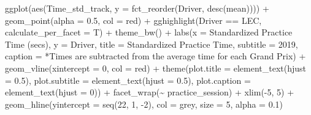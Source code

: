 \documentclass[
]{book}
\newenvironment{Shaded}{\begin{snugshade}}{\end{snugshade}}
\newcommand{\AttributeTok}[1]{\textcolor[rgb]{0.77,0.63,0.00}{#1}}
\newcommand{\DecValTok}[1]{\textcolor[rgb]{0.00,0.00,0.81}{#1}}
\newcommand{\FloatTok}[1]{\textcolor[rgb]{0.00,0.00,0.81}{#1}}
\newcommand{\FunctionTok}[1]{\textcolor[rgb]{0.00,0.00,0.00}{#1}}
\newcommand{\NormalTok}[1]{#1}
\newcommand{\SpecialCharTok}[1]{\textcolor[rgb]{0.00,0.00,0.00}{#1}}
\newcommand{\StringTok}[1]{\textcolor[rgb]{0.31,0.60,0.02}{#1}}
\begin{document}
\begin{Shaded}
\begin{Highlighting}[]
   \FunctionTok{ggplot}\NormalTok{(}\FunctionTok{aes}\NormalTok{(Time\_std\_track, }\AttributeTok{y =} \FunctionTok{fct\_reorder}\NormalTok{(Driver, }\FunctionTok{desc}\NormalTok{(mean)))) }\SpecialCharTok{+}
   \FunctionTok{geom\_point}\NormalTok{(}\AttributeTok{alpha =} \FloatTok{0.5}\NormalTok{, }\AttributeTok{col =} \StringTok{\textquotesingle{}red\textquotesingle{}}\NormalTok{) }\SpecialCharTok{+}
  \FunctionTok{gghighlight}\NormalTok{(Driver }\SpecialCharTok{==} \StringTok{\textquotesingle{}LEC\textquotesingle{}}\NormalTok{, }\AttributeTok{calculate\_per\_facet =}\NormalTok{ T) }\SpecialCharTok{+} 
   \FunctionTok{theme\_bw}\NormalTok{() }\SpecialCharTok{+}
   \FunctionTok{labs}\NormalTok{(}\AttributeTok{x =} \StringTok{\textquotesingle{}Standardized Practice Time (secs)\textquotesingle{}}\NormalTok{,}
        \AttributeTok{y =} \StringTok{\textquotesingle{}Driver\textquotesingle{}}\NormalTok{,}
        \AttributeTok{title =} \StringTok{\textquotesingle{}Standardized Practice Time\textquotesingle{}}\NormalTok{,}
        \AttributeTok{subtitle =} \StringTok{\textquotesingle{}2019\textquotesingle{}}\NormalTok{,}
        \AttributeTok{caption =} \StringTok{\textquotesingle{}*Times are subtracted from the average time for each Grand Prix\textquotesingle{}}\NormalTok{) }\SpecialCharTok{+}
   \FunctionTok{geom\_vline}\NormalTok{(}\AttributeTok{xintercept =} \DecValTok{0}\NormalTok{, }\AttributeTok{col =} \StringTok{\textquotesingle{}red\textquotesingle{}}\NormalTok{) }\SpecialCharTok{+}
   \FunctionTok{theme}\NormalTok{(}\AttributeTok{plot.title =} \FunctionTok{element\_text}\NormalTok{(}\AttributeTok{hjust =} \FloatTok{0.5}\NormalTok{),}
         \AttributeTok{plot.subtitle =} \FunctionTok{element\_text}\NormalTok{(}\AttributeTok{hjust =} \FloatTok{0.5}\NormalTok{),}
         \AttributeTok{plot.caption =} \FunctionTok{element\_text}\NormalTok{(}\AttributeTok{hjust =} \DecValTok{0}\NormalTok{)) }\SpecialCharTok{+}
  \FunctionTok{facet\_wrap}\NormalTok{(}\SpecialCharTok{\textasciitilde{}}\NormalTok{ practice\_session) }\SpecialCharTok{+}
  \FunctionTok{xlim}\NormalTok{(}\SpecialCharTok{{-}}\DecValTok{5}\NormalTok{, }\DecValTok{5}\NormalTok{)  }\SpecialCharTok{+}
  \FunctionTok{geom\_hline}\NormalTok{(}\AttributeTok{yintercept =} \FunctionTok{seq}\NormalTok{(}\DecValTok{22}\NormalTok{, }\DecValTok{1}\NormalTok{, }\SpecialCharTok{{-}}\DecValTok{2}\NormalTok{), }\AttributeTok{col =} \StringTok{\textquotesingle{}grey\textquotesingle{}}\NormalTok{, }\AttributeTok{size =} \DecValTok{5}\NormalTok{, }\AttributeTok{alpha =}  \FloatTok{0.1}\NormalTok{)}
\end{Highlighting}
\end{Shaded}
\end{document}
